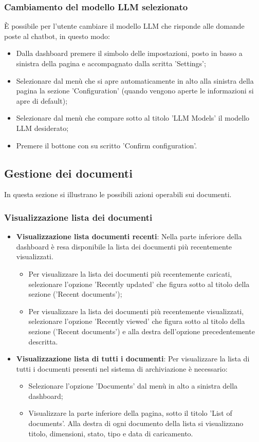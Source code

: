 \documentclass[10pt, a4paper]{article}
\begin{document}
\subsubsection{Cambiamento del modello LLM selezionato}
È possibile per l'utente cambiare il modello LLM che risponde alle domande poste al chatbot, in questo modo:
\begin{itemize}
    \item Dalla dashboard premere il simbolo delle impostazioni, posto in basso a sinistra della pagina e accompagnato dalla scritta 'Settings';
    \item Selezionare dal menù che si apre automaticamente in alto alla sinistra della pagina la sezione 'Configuration' (quando vengono aperte le informazioni si apre di default);
    \item Selezionare dal menù che compare sotto al titolo 'LLM Models' il modello LLM desiderato;
    \item Premere il bottone con su scritto 'Confirm configuration'.
\end{itemize}

\subsection{Gestione dei documenti}
In questa sezione si illustrano le possibili azioni operabili sui documenti.
\subsubsection{Visualizzazione lista dei documenti}
\begin{itemize}
    \item \textbf{Visualizzazione lista documenti recenti}: Nella parte inferiore della dashboard è resa disponibile la lista dei documenti più recentemente visualizzati.
    \begin{itemize}
        \item Per visualizzare la lista dei documenti più recentemente caricati, selezionare l'opzione 'Recently updated' che figura sotto al titolo della sezione ('Recent documents');
        \item Per visualizzare la lista dei documenti più recentemente visualizzati, selezionare l'opzione 'Recently viewed' che figura sotto al titolo della sezione ('Recent documents') e alla destra dell'opzione precedentemente descritta.
    \end{itemize}
    \item \textbf{Visualizzazione lista di tutti i documenti}: Per visualizzare la lista di tutti i documenti presenti nel sistema di archiviazione è necessario:
    \begin{itemize}
        \item Selezionare l'opzione 'Documents' dal menù in alto a sinistra della dashboard;
        \item Visualizzare la parte inferiore della pagina, sotto il titolo 'List of documents'. Alla destra di ogni documento della lista si visualizzano titolo, dimensioni, stato, tipo e data di caricamento.
    \end{itemize}
\end{itemize}
\end{document}

